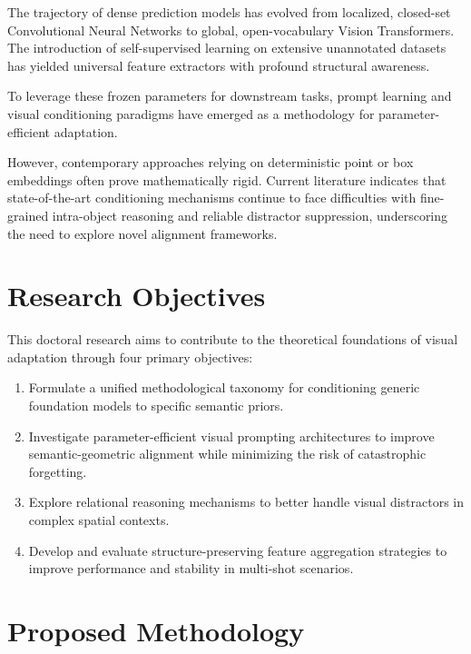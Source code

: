 \documentclass[journal,12pt,onecolumn,draftclsnofoot]{IEEEtran}
\begin{document}
The trajectory of dense prediction models has evolved from localized, closed-set Convolutional Neural Networks to global, open-vocabulary Vision Transformers. The introduction of self-supervised learning on extensive unannotated datasets has yielded universal feature extractors with profound structural awareness.

To leverage these frozen parameters for downstream tasks, prompt learning and visual conditioning paradigms have emerged as a methodology for parameter-efficient adaptation.

However, contemporary approaches relying on deterministic point or box embeddings often prove mathematically rigid. Current literature indicates that state-of-the-art conditioning mechanisms continue to face difficulties with fine-grained intra-object reasoning and reliable distractor suppression, underscoring the need to explore novel alignment frameworks.

\section{Research Objectives}

This doctoral research aims to contribute to the theoretical foundations of visual adaptation through four primary objectives:

\begin{enumerate}[label=\arabic*., noitemsep, topsep=0pt]
    \item Formulate a unified methodological taxonomy for conditioning generic foundation models to specific semantic priors.

    \item Investigate parameter-efficient visual prompting architectures to improve semantic-geometric alignment while minimizing the risk of catastrophic forgetting.

    \item Explore relational reasoning mechanisms to better handle visual distractors in complex spatial contexts.

    \item Develop and evaluate structure-preserving feature aggregation strategies to improve performance and stability in multi-shot scenarios.
\end{enumerate}

\section{Proposed Methodology}
\end{document}
